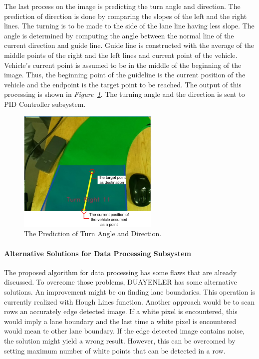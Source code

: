 \documentclass[a4paper,12pt]{article}
\begin{document}
	The last process on the image is predicting the turn angle and direction. The prediction of direction is done by comparing the slopes of the left and the right lines. The turning is to be made to the side of the lane line having less slope. The angle is determined by computing the angle between the normal line of the current direction and guide line. Guide line is constructed with the average of the middle points of the right and the left lines and current point of the vehicle. Vehicle's current point is assumed to be in the middle of the beginning of the image. Thus, the beginning point of the guideline is the current position of the vehicle and the endpoint is the target point to be reached. The output of this processing is shown in \textit{Figure~\ref{fig:turn-prediction-explained}}. The turning angle and the direction is sent to PID Controller subsystem.
	
	\begin{figure}[H]
		\center
		\setlength{\unitlength}{\textwidth} 
		\includegraphics[width=0.6\textwidth]{images/turn-prediction-explained}
		\caption{\label{fig:turn-prediction-explained}The Prediction of Turn Angle and Direction.}
	\end{figure}
	\paragraph{Alternative Solutions for Data Processing Subsystem}
		The proposed algorithm for data processing has some flaws that are already discussed. To overcome those problems, DUAYENLER has some alternative solutions. An improvement might be on finding lane boundaries. This operation is currently realized with Hough Lines function. Another approach would be to scan rows an accurately edge detected image. If a white pixel is encountered, this would imply a lane boundary and the last time a white pixel is encountered would mean te other lane boundary. If the edge detected image contains noise, the solution might yield a wrong result. However, this can be overcomed by setting maximum number of white points that can be detected in a row.
		
\end{document}

